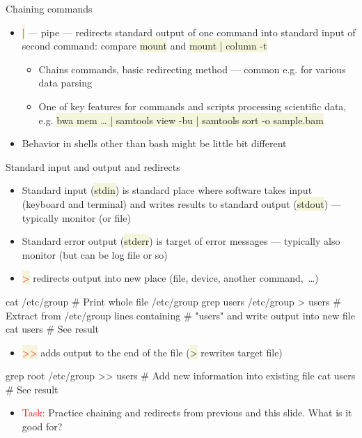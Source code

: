 \documentclass[compress, xelatex, 11pt, xcolor=svgnames, aspectratio=169, url={hyphens, lowtilde}]{beamer}
\renewcommand{\texttt}[1]{\colorbox{Beige}{{\ttfamily #1}}}
\renewcommand{\alert}[1]{\textcolor{red}{#1}}
\begin{document}
\begin{frame}[allowframebreaks]{Chaining commands}
\begin{itemize}
\begin{itemize}
			\item Easy way how to do something when previous command fails, either exit script (\texttt{\ldots{ }|| exit 1}) or somehow fix it (see above), report problem (\texttt{\ldots{ }|| \textbraceleft echo "It failed!" \&\& exit 1; \textbraceright}) or so
		\end{itemize}
		\item \alert{\texttt{|}} --- pipe --- redirects standard output of one command into standard input of second command: compare \texttt{mount} and \texttt{mount | column -t}
		\begin{itemize}
			\item Chains commands, basic redirecting method --- common e.g. for various data parsing
			\item One of key features for commands and scripts processing scientific data, e.g. \texttt{bwa mem \ldots{ }| samtools view -bu | samtools sort -o sample.bam}
		\end{itemize}
		\item Behavior in shells other than bash might be little bit different
	\end{itemize}
\end{frame}

\begin{frame}[fragile]{Standard input and output and redirects}
	\begin{itemize}
		\item Standard input (\texttt{stdin}) is standard place where software takes input (keyboard and terminal) and writes results to standard output (\texttt{stdout}) --- typically monitor (or file)
		\item Standard error output (\texttt{stderr}) is target of error messages --- typically also monitor (but can be log file or so)
		\item \alert{\texttt{\textgreater}} redirects output into new place (file, device, another command,~\ldots)
	\end{itemize}
	\vfill
	\begin{bashcode}
    cat /etc/group # Print whole file /etc/group
    grep users /etc/group > users # Extract from /etc/group lines containing
                                  # "users" and write output into new file
    cat users # See result
	\end{bashcode}
	\vfill
	\begin{itemize}
		\item \alert{\texttt{\textgreater\textgreater}} adds output to the end of the file (\texttt{\textgreater} rewrites target file)
	\end{itemize}
	\vfill
	\begin{bashcode}
    grep root /etc/group >> users # Add new information into existing file
    cat users # See result
	\end{bashcode}
	\vfill
	\begin{itemize}
		\item \alert{Task:} Practice chaining and redirects from previous and this slide. What is it good for?
	\end{itemize}
\end{frame}
\end{document}
